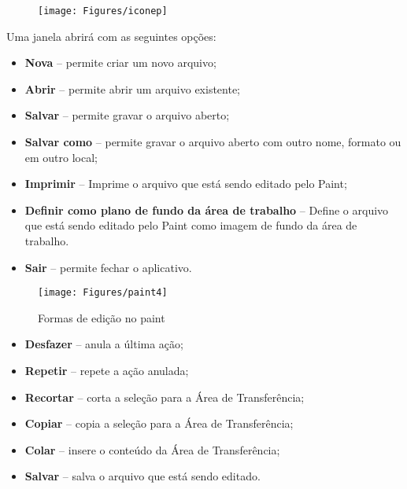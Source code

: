 \documentclass[hidelinks,12pt]{article}
\begin{document}
			\begin{figure}[!h]
				\centering
				\texttt{[image: Figures/iconep]}
				\label{fig:paintp}
			\end{figure}
			
			Uma janela abrirá com as seguintes opções:
			
			\begin{itemize}
				\item {\bf Nova} – permite criar um novo arquivo;
				
				\item {\bf Abrir} – permite abrir um arquivo existente;
				
				\item {\bf Salvar} – permite gravar o arquivo aberto;
				
				\item {\bf Salvar como} – permite gravar o arquivo aberto com outro nome, formato ou em outro local;
				
				\item {\bf Imprimir} – Imprime o arquivo que está sendo editado pelo Paint;
				
				\item {\bf Definir como plano de fundo da área de trabalho} – Define o arquivo que está sendo editado pelo Paint como imagem de fundo da área de trabalho.
				
				\item {\bf Sair} – permite fechar o aplicativo.
			\end{itemize}
			\bigskip
			\begin{figure}[!h]
				\centering
				\texttt{[image: Figures/paint4]}
				\label{fig:paint4}
				\caption{Formas de edição no paint}
			\end{figure}
			
			\begin{itemize}
				\item {\bf Desfazer} – anula a última ação;
				
				\item {\bf Repetir} – repete a ação anulada;
				
				\item {\bf Recortar} – corta a seleção para a Área de Transferência;
				
				\item {\bf Copiar} – copia a seleção para a Área de Transferência;
				
				\item {\bf Colar} – insere o conteúdo da Área de Transferência;
				
				\item {\bf Salvar} – salva o arquivo que está sendo editado.
			\end{itemize}
			
\end{document}
